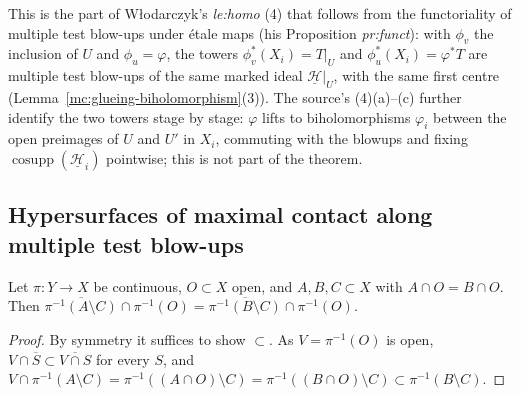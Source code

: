 This is the part of Włodarczyk's \emph{le:homo} (4) that follows from the functoriality of multiple test blow-ups under étale maps (his
Proposition \emph{pr:funct}): with \(\phi_v\) the inclusion of \(U\) and \(\phi_u=\varphi\), the towers \(\phi_v^*(X_i)=T|_U\) and
\(\phi_u^*(X_i)=\varphi^*T\) are multiple test blow-ups of the same marked ideal \(\underline{\mathcal H}|_U\), with the same first centre
(Lemma~\ref{mc:glueing-biholomorphism}(3)). The source's (4)(a)--(c) further identify the two towers stage by stage: \(\varphi\) lifts to
biholomorphisms \(\varphi_i\) between the open preimages of \(U\) and \(U'\) in \(X_i\), commuting with the blowups and fixing
\(\operatorname{cosupp}(\underline{\mathcal H}_i)\) pointwise; this is not part of the theorem.

\subsection{Hypersurfaces of maximal contact along multiple test blow-ups}

\begin{lemma}
\label{mc:strict-transform-local}
\leanok
Let \(\pi\colon Y\to X\) be continuous, \(O\subset X\) open, and \(A,B,C\subset X\) with \(A\cap O=B\cap O\). Then
\(\overline{\pi^{-1}(A\setminus C)}\cap\pi^{-1}(O)=\overline{\pi^{-1}(B\setminus C)}\cap\pi^{-1}(O)\).
\end{lemma}
\begin{proof}
\leanok
By symmetry it suffices to show \(\subset\). As \(V=\pi^{-1}(O)\) is open, \(V\cap\overline S\subset\overline{V\cap S}\) for every \(S\), and
\(V\cap\pi^{-1}(A\setminus C)=\pi^{-1}((A\cap O)\setminus C)=\pi^{-1}((B\cap O)\setminus C)\subset\pi^{-1}(B\setminus C)\).
\end{proof}

